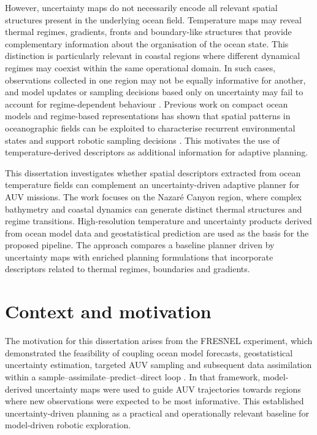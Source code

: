 However, uncertainty maps do not necessarily encode all relevant spatial structures present in the underlying ocean field. Temperature maps may reveal thermal regimes, gradients, fronts and boundary-like structures that provide complementary information about the organisation of the ocean state. This distinction is particularly relevant in coastal regions where different dynamical regimes may coexist within the same operational domain. In such cases, observations collected in one region may not be equally informative for another, and model updates or sampling decisions based only on uncertainty may fail to account for regime-dependent behaviour \cite{mendes2025oceanmodeldriven}. Previous work on compact ocean models and regime-based representations has shown that spatial patterns in oceanographic fields can be exploited to characterise recurrent environmental states and support robotic sampling decisions \cite{fossum2020compact,ge2023watermasses}. This motivates the use of temperature-derived descriptors as additional information for adaptive planning.

This dissertation investigates whether spatial descriptors extracted from ocean temperature fields can complement an uncertainty-driven adaptive planner for AUV missions. The work focuses on the Nazaré Canyon region, where complex bathymetry and coastal dynamics can generate distinct thermal structures and regime transitions. High-resolution temperature and uncertainty products derived from ocean model data and geostatistical prediction are used as the basis for the proposed pipeline. The approach compares a baseline planner driven by uncertainty maps with enriched planning formulations that incorporate descriptors related to thermal regimes, boundaries and gradients.


\section{Context and motivation} \label{sec:context_motivation}

The motivation for this dissertation arises from the FRESNEL experiment, which demonstrated the feasibility of coupling ocean model forecasts, geostatistical uncertainty estimation, targeted AUV sampling and subsequent data assimilation within a sample--assimilate--predict--direct loop \cite{mendes2025oceanmodeldriven}. In that framework, model-derived uncertainty maps were used to guide AUV trajectories towards regions where new observations were expected to be most informative. This established uncertainty-driven planning as a practical and operationally relevant baseline for model-driven robotic exploration.

